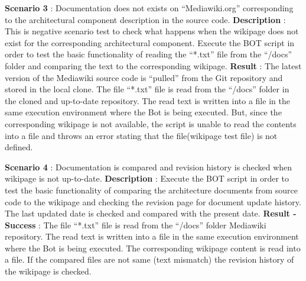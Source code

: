 \begin{mdframed}[leftmargin=10pt,rightmargin=10pt]
\textbf{Scenario 3} : Documentation does not exists on \enquote{Mediawiki.org} corresponding to the architectural component description in the source code.
\newline
\newline \textbf{Description} : This is negative scenario test to check what happens when the wikipage does not exist for the corresponding architectural component. Execute the BOT script in order to test the basic functionality of reading the \enquote{*.txt} file from the \enquote{/docs} folder and comparing the text to the corresponding wikipage. 
\newline 
\newline \textbf{Result} : The latest version of the Mediawiki source code is \enquote{pulled} from the Git repository and stored in the local clone. The file \enquote{*.txt} file is read from the \enquote{/docs} folder in the cloned and up-to-date repository. The read text is written into a file in the same execution environment where the Bot is being executed. But, since the corresponding wikipage is not available, the script is unable to read the contents into a file and throws an error stating that the file(wikipage test file) is not defined.
\end{mdframed}

\begin{mdframed}[leftmargin=10pt,rightmargin=10pt]
\textbf{Scenario 4} : Documentation is compared and revision history is checked when wikipage is not up-to-date.
\newline
\newline \textbf{Description} : Execute the BOT script in order to test the basic functionality of comparing the architecture documents from source code to the wikipage and checking the revision page for document update history. The last updated date is checked and compared with the present date.
\newline 
\newline \textbf{Result - Success} : The file \enquote{*.txt} file is read from the \enquote{/docs} folder Mediawiki repository. The read text is written into a file in the same execution environment where the Bot is being executed. The corresponding wikipage content is read into a file. If the compared files are not same (text mismatch) the revision history of the wikipage is checked.
\end{mdframed}

